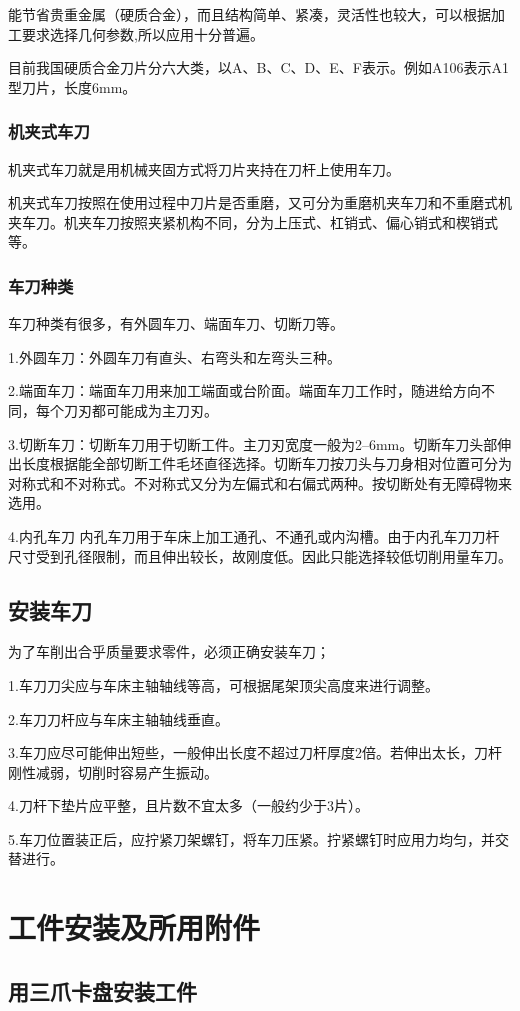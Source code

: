 \documentclass{ctexbook}
\begin{document}
能节省贵重金属（硬质合金），而且结构简单、紧凑，灵活性也较大，可以根据加工要求选择几何参数,所以应用十分普遍。

目前我国硬质合金刀片分六大类，以A、B、C、D、E、F表示。例如A106表示A1型刀片，长度6mm。
\subsubsection{机夹式车刀}
机夹式车刀就是用机械夹固方式将刀片夹持在刀杆上使用车刀。

机夹式车刀按照在使用过程中刀片是否重磨，又可分为重磨机夹车刀和不重磨式机夹车刀。机夹车刀按照夹紧机构不同，分为上压式、杠销式、偏心销式和楔销式等。
\subsubsection{车刀种类}
车刀种类有很多，有外圆车刀、端面车刀、切断刀等。

1.外圆车刀：外圆车刀有直头、右弯头和左弯头三种。

2.端面车刀：端面车刀用来加工端面或台阶面。端面车刀工作时，随进给方向不同，每个刀刃都可能成为主刀刃。

3.切断车刀：切断车刀用于切断工件。主刀刃宽度一般为2--6mm。切断车刀头部伸出长度根据能全部切断工件毛坯直径选择。切断车刀按刀头与刀身相对位置可分为对称式和不对称式。不对称式又分为左偏式和右偏式两种。按切断处有无障碍物来选用。

4.内孔车刀
内孔车刀用于车床上加工通孔、不通孔或内沟槽。由于内孔车刀刀杆尺寸受到孔径限制，而且伸出较长，故刚度低。因此只能选择较低切削用量车刀。
\subsection{安装车刀}
为了车削出合乎质量要求零件，必须正确安装车刀；

1.车刀刀尖应与车床主轴轴线等高，可根据尾架顶尖高度来进行调整。

2.车刀刀杆应与车床主轴轴线垂直。

3.车刀应尽可能伸出短些，一般伸出长度不超过刀杆厚度2倍。若伸出太长，刀杆刚性减弱，切削时容易产生振动。

4.刀杆下垫片应平整，且片数不宜太多（一般约少于3片）。

5.车刀位置装正后，应拧紧刀架螺钉，将车刀压紧。拧紧螺钉时应用力均匀，并交替进行。
\section{工件安装及所用附件}
\subsection{用三爪卡盘安装工件}
\end{document}
